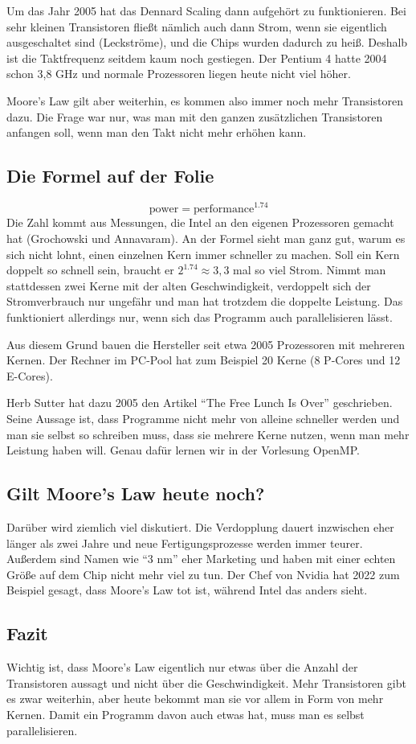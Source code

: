 \documentclass[11pt]{article}
\begin{document}
Um das Jahr 2005 hat das Dennard Scaling dann aufgehört zu funktionieren. Bei sehr kleinen
Transistoren fließt nämlich auch dann Strom, wenn sie eigentlich ausgeschaltet sind
(Leckströme), und die Chips wurden dadurch zu heiß. Deshalb ist die Taktfrequenz seitdem kaum
noch gestiegen. Der Pentium 4 hatte 2004 schon 3,8 GHz und normale Prozessoren liegen heute nicht
viel höher.

Moore's Law gilt aber weiterhin, es kommen also immer noch mehr Transistoren dazu. Die Frage war
nur, was man mit den ganzen zusätzlichen Transistoren anfangen soll, wenn man den Takt nicht mehr
erhöhen kann.

\subsection*{Die Formel auf der Folie}

\[
  \mathrm{power} = \mathrm{performance}^{1.74}
\]
Die Zahl kommt aus Messungen, die Intel an den eigenen Prozessoren gemacht hat (Grochowski und
Annavaram). An der Formel sieht man ganz gut, warum es sich nicht lohnt, einen einzelnen Kern
immer schneller zu machen. Soll ein Kern doppelt so schnell sein, braucht er
$2^{1.74} \approx 3{,}3$ mal so viel Strom. Nimmt man stattdessen zwei Kerne mit der alten
Geschwindigkeit, verdoppelt sich der Stromverbrauch nur ungefähr und man hat trotzdem die
doppelte Leistung. Das funktioniert allerdings nur, wenn sich das Programm auch parallelisieren
lässt.

Aus diesem Grund bauen die Hersteller seit etwa 2005 Prozessoren mit mehreren Kernen. Der Rechner
im PC-Pool hat zum Beispiel 20 Kerne (8 P-Cores und 12 E-Cores).

Herb Sutter hat dazu 2005 den Artikel "`The Free Lunch Is Over"' geschrieben. Seine Aussage ist,
dass Programme nicht mehr von alleine schneller werden und man sie selbst so schreiben muss, dass
sie mehrere Kerne nutzen, wenn man mehr Leistung haben will. Genau dafür lernen wir in der
Vorlesung OpenMP.

\subsection*{Gilt Moore's Law heute noch?}

Darüber wird ziemlich viel diskutiert. Die Verdopplung dauert inzwischen eher länger als zwei
Jahre und neue Fertigungsprozesse werden immer teurer. Außerdem sind Namen wie "`3 nm"' eher
Marketing und haben mit einer echten Größe auf dem Chip nicht mehr viel zu tun. Der Chef von
Nvidia hat 2022 zum Beispiel gesagt, dass Moore's Law tot ist, während Intel das anders sieht.

\subsection*{Fazit}

Wichtig ist, dass Moore's Law eigentlich nur etwas über die Anzahl der Transistoren aussagt
und nicht über die Geschwindigkeit. Mehr Transistoren gibt es zwar weiterhin, aber heute bekommt
man sie vor allem in Form von mehr Kernen. Damit ein Programm davon auch etwas hat, muss man es
selbst parallelisieren.
\end{document}
